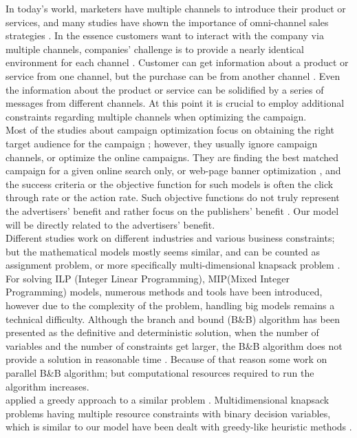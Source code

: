 \documentclass[11pt]{article}
\begin{document}
In today’s world, marketers have multiple channels to introduce their product or services, and many studies have shown the importance of omni-channel sales strategies \citep{shankar, park}. In the essence customers want to interact with the company via multiple channels, companies’ challenge is to provide a nearly identical environment for each channel \citep{bell}. Customer can get information about a product or service from one channel, but the purchase can be from another channel \citep{park}. Even the information about the product or service can be solidified by a series of messages from different channels. At this point it is crucial to employ additional constraints regarding multiple channels when optimizing the campaign.\\

Most of the studies about campaign optimization focus on obtaining the right target audience for the campaign \citep{goul}; however, they usually ignore campaign channels, or optimize the online campaigns. They are finding the best matched campaign for a given online search only, or web-page banner optimization \citep{liu}, and the success criteria or the objective function for such models is often the click through rate or the action rate. Such objective functions do not truly represent the advertisers’ benefit and rather focus on the publishers’ benefit \citep{altshuler}. Our model will be directly related to the advertisers’ benefit.\\

Different studies work on different industries and various business constraints; but the mathematical models mostly seems similar, and can be counted as assignment problem, or more specifically multi-dimensional knapsack problem \citep{cohen_exp, oliveira_hypr}. For solving ILP (Integer Linear Programming), MIP(Mixed Integer Programming) models, numerous methods and tools have been introduced\citep{fallah_bb, chu_mip}, however due to the complexity of the problem, handling big models remains a technical difficulty. Although the branch and bound (B\&B) algorithm has been presented as the definitive and deterministic solution, when the number of variables and the number of constraints get larger, the B\&B algorithm does not provide a solution in reasonable time \citep{herrera_pbb, sato}. Because of that reason some work on parallel B\&B algorithm\citep{fallah_bb, sato}; but computational resources required to run the algorithm increases.\\ \citeauthor{cohen_exp} applied a greedy approach to a similar problem \citep{cohen_exp}. Multidimensional knapsack problems having multiple resource constraints with binary decision variables, which is similar to our model have been dealt with greedy-like heuristic methods \citep{akcay_mdkp}.
\end{document}
